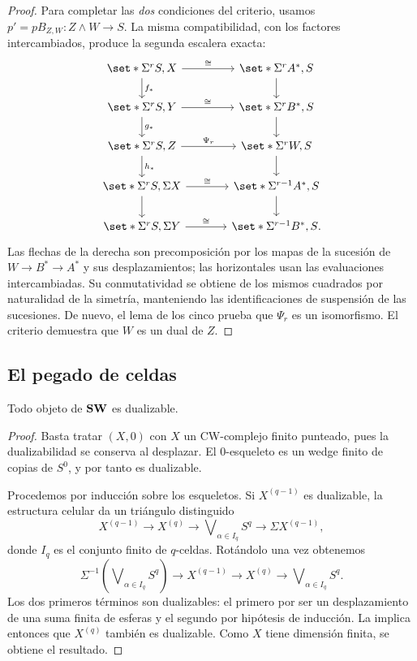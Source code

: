 \begin{proof}
Para completar las \emph{dos} condiciones del criterio, usamos $p'=pB_{Z,W}\colon Z\wedge W\to S$. La misma compatibilidad, con los factores intercambiados, produce la segunda escalera exacta:
\[
\begin{tikzcd}[column sep=large]
\set*{\Sigma^rS,X} \arrow[d,"f_*"] \arrow[r,"\cong"] & \set*{\Sigma^rA^*,S} \arrow[d]\\
\set*{\Sigma^rS,Y} \arrow[d,"g_*"] \arrow[r,"\cong"] & \set*{\Sigma^rB^*,S} \arrow[d]\\
\set*{\Sigma^rS,Z} \arrow[d,"h_*"] \arrow[r,"\Psi_r"] & \set*{\Sigma^rW,S} \arrow[d]\\
\set*{\Sigma^rS,\Sigma X} \arrow[d] \arrow[r,"\cong"] & \set*{\Sigma^{r-1}A^*,S} \arrow[d]\\
\set*{\Sigma^rS,\Sigma Y} \arrow[r,"\cong"] & \set*{\Sigma^{r-1}B^*,S}.
\end{tikzcd}
\]
Las flechas de la derecha son precomposición por los mapas de la sucesión de $W\to B^*\to A^*$ y sus desplazamientos; las horizontales usan las evaluaciones intercambiadas. Su conmutatividad se obtiene de los mismos cuadrados por naturalidad de la simetría, manteniendo las identificaciones de suspensión de las sucesiones. De nuevo, el lema de los cinco prueba que $\Psi_r$ es un isomorfismo. El criterio demuestra que $W$ es un dual de $Z$.
\end{proof}

\subsection{El pegado de celdas}

\begin{teo}\label{teo:todo-dualizable}
Todo objeto de $\mathbf{SW}$ es dualizable.
\end{teo}
\begin{proof}
Basta tratar $(X,0)$ con $X$ un CW-complejo finito punteado, pues la dualizabilidad se conserva al desplazar. El $0$-esqueleto es un wedge finito de copias de $S^0$, y por tanto es dualizable.

Procedemos por inducción sobre los esqueletos. Si $X^{(q-1)}$ es dualizable, la estructura celular da un triángulo distinguido
\[
X^{(q-1)}\longrightarrow X^{(q)}
\longrightarrow \bigvee\nolimits_{\!\!\alpha\in I_q}S^q
\longrightarrow \Sigma X^{(q-1)},
\]
donde $I_q$ es el conjunto finito de $q$-celdas. Rotándolo una vez obtenemos
\[
\Sigma^{-1}\!\left(\bigvee\nolimits_{\!\!\alpha\in I_q}S^q\right)
\longrightarrow X^{(q-1)}
\longrightarrow X^{(q)}
\longrightarrow \bigvee\nolimits_{\!\!\alpha\in I_q}S^q.
\]
Los dos primeros términos son dualizables: el primero por ser un desplazamiento de una suma finita de esferas y el segundo por hipótesis de inducción. La  implica entonces que $X^{(q)}$ también es dualizable. Como $X$ tiene dimensión finita, se obtiene el resultado.
\end{proof}


